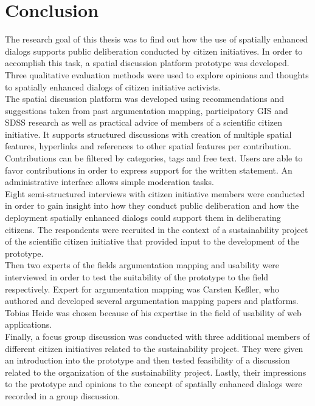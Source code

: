 \section{Conclusion}
\label{chap:conclusion}
The research goal of this thesis was to find out how the use of spatially enhanced dialogs supports public deliberation conducted by citizen initiatives. In order to accomplish this task, a spatial discussion platform prototype was developed. Three qualitative evaluation methods were used to explore opinions and thoughts to spatially enhanced dialogs of citizen initiative activists.\\
The spatial discussion platform was developed using recommendations and suggestions taken from past argumentation mapping, participatory GIS and SDSS research as well as practical advice of members of a scientific citizen initiative. It supports structured discussions with creation of multiple spatial features, hyperlinks and references to other spatial features per contribution. Contributions can be filtered by categories, tags and free text. Users are able to favor contributions in order to express support for the written statement. An administrative interface allows simple moderation tasks.\\
Eight semi-structured interviews with citizen initiative members were conducted in order to gain insight into how they conduct public deliberation and how the deployment spatially enhanced dialogs could support them in deliberating citizens. The respondents were recruited in the context of a sustainability project of the scientific citizen initiative that provided input to the development of the prototype.\\
Then two experts of the fields argumentation mapping and usability were interviewed in order to test the suitability of the prototype to the field respectively. Expert for argumentation mapping was Carsten Keßler, who authored and developed several argumentation mapping papers and platforms. Tobias Heide was chosen because of his expertise in the field of usability of web applications.\\
Finally, a focus group discussion was conducted with three additional members of different citizen initiatives related to the sustainability project. They were given an introduction into the prototype and then tested feasibility of a discussion related to the organization of the sustainability project. Lastly, their impressions to the prototype and opinions to the concept of spatially enhanced dialogs were recorded in a group discussion.\\
